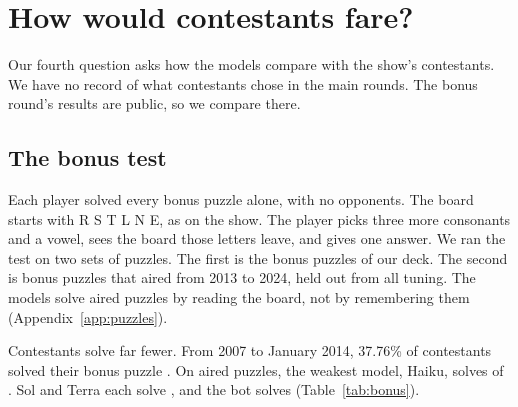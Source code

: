 \section{How would contestants fare?}\label{sec:contestants}

Our fourth question asks how the models compare with the show's contestants. We have no record of what contestants chose in the main rounds. The bonus round's results are public, so we compare there.

\subsection{The bonus test}

Each player solved every bonus puzzle alone, with no opponents. The board starts with R S T L N E, as on the show. The player picks three more consonants and a vowel, sees the board those letters leave, and gives one answer. We ran the test on two sets of puzzles. The first is the \BonusPuzzles{} bonus puzzles of our deck. The second is \AiredBonusPuzzles{} bonus puzzles that aired from 2013 to 2024, held out from all tuning. The models solve aired puzzles by reading the board, not by remembering them (Appendix~\ref{app:puzzles}).

Contestants solve far fewer. From 2007 to January 2014, 37.76\% of contestants solved their bonus puzzle \citep{spaniel2014}. On aired puzzles, the weakest model, Haiku, solves \AiredBonusHaiku{} of \AiredBonusPuzzles. Sol and Terra each solve \AiredBonusSol, and the bot solves \AiredBonusBot{} (Table~\ref{tab:bonus}).

